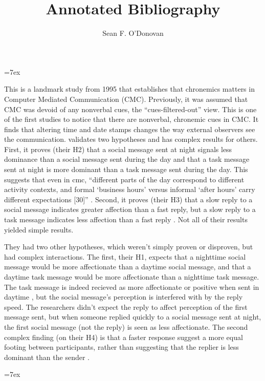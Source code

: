 \documentclass[
  stu]{apa7}
\affiliation{Brian Lamb School of Communication}
\title{Annotated Bibliography}
\author{Sean F. O'Donovan}
\date{}
\begin{document}
\maketitle

\noindent \hangindent=7ex 

This is a landmark study from 1995 that establishes that chronemics
matters in Computer Mediated Communication (CMC). Previously, it was
assumed that CMC was devoid of any nonverbal cues, the
``cues-filtered-out'' view. This is one of the first studies to notice
that there are nonverbal, chronemic cues in CMC. It finds that altering
time and date stamps changes the way external observers see the
communication. \textcite{walther95} validates two hypotheses and has
complex results for others. First, it proves (their H2) that a social
message sent at night signals less dominance than a social message sent
during the day and that a task message sent at night is more dominant
than a task message sent during the day. This suggests that even in cmc,
``different parts of the day correspond to different activity contexts,
and formal `business hours' versus informal `after hours' carry
different expectations {[}30{]}'' \autocite[ 361]{walther95}. Second, it
proves (their H3) that a slow reply to a social message indicates
greater affection than a fast reply, but a slow reply to a task message
indicates less affection than a fast reply \autocite[ 370]{walther95}.
Not all of their results yielded simple results.

They had two other hypotheses, which weren't simply proven or disproven,
but had complex interactions. The first, their H1, expects that a
nighttime social message would be more affectionate than a daytime
social message, and that a daytime task message would be more
affectionate than a nighttime task message. The task message is indeed
recieved as more affectionate or positive when sent in daytime
\autocite[ 368]{walther95}, but the social message's perception is
interfered with by the reply speed. The researchers didn't expect the
reply to affect perception of the first message sent, but when someone
replied quickly to a social message sent at night, the first social
message (not the reply) is seen as less affectionate. The second complex
finding (on their H4) is that a faster response suggest a more equal
footing between participants, rather than suggesting that the replier is
less dominant than the sender \autocite[ 371]{walther95}.

\noindent \hangindent=7ex 
\end{document}
